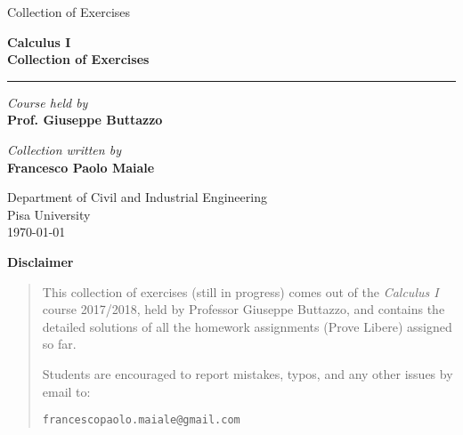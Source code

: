 \documentclass[a4paper,10 pt]{report}
\theoremstyle{definition}
\begin{document}
\newpage

\begin{titlepage}
\begin{center}

\vspace*{2cm}

{\Large Collection of Exercises}\\\vspace{1.5cm}
{\Huge\bfseries Calculus I\\Collection of Exercises\par}\vspace{2cm}

\rule{\linewidth}{0.5mm}\vspace{1cm}

\begin{minipage}{0.45\textwidth}
    \begin{center}
        \textit{Course held by}\\[0.5cm]
        {\Large\bfseries Prof. Giuseppe Buttazzo}
    \end{center}
\end{minipage}
\hfill
\begin{minipage}{0.45\textwidth}
    \begin{center}
        \textit{Collection written by}\\[0.5cm]
        {\Large\bfseries Francesco Paolo Maiale}
    \end{center}
\end{minipage}

\vfill

\begin{center}
    {\large
    Department of Civil and Industrial Engineering\\[0.4em]
    Pisa University\\[0.4em]
    \today
    }
\end{center}

\end{center}
\end{titlepage}

\newpage
{\Huge\bfseries Disclaimer}\par
\vspace{1cm}
\begin{quotation}
\noindent
This collection of exercises (still in progress) comes out of the \textit{Calculus I} course 2017/2018, held by Professor Giuseppe Buttazzo, and contains the detailed solutions of all the homework assignments (Prove Libere) assigned so far.

\vspace{0.5cm}
\noindent
Students are encouraged to report mistakes, typos, and any other issues by email to:
\begin{center}
    \texttt{francescopaolo.maiale@gmail.com}
\end{center}
\end{quotation}
\end{document}
